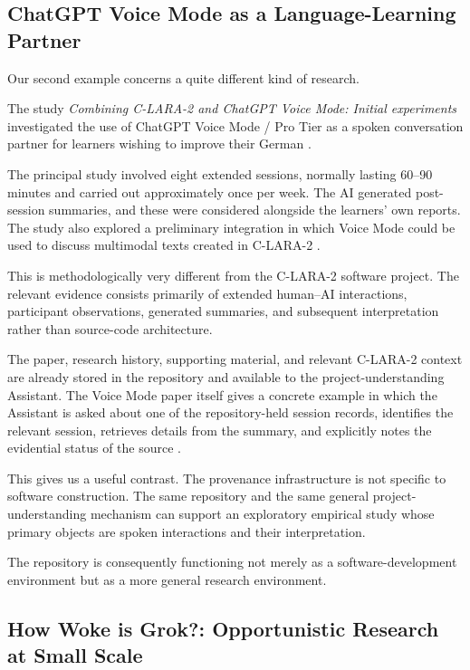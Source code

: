 \documentclass[12pt]{article}
\begin{document}
\subsection{ChatGPT Voice Mode as a Language-Learning Partner}

Our second example concerns a quite different kind of research.

The study \emph{Combining C-LARA-2 and ChatGPT Voice Mode: Initial experiments} investigated the use of ChatGPT Voice Mode / Pro Tier as a spoken conversation partner for learners wishing to improve their German \citep{wrightEtAl2026voice}.

The principal study involved eight extended sessions, normally lasting 60--90 minutes and carried out approximately once per week. The AI generated post-session summaries, and these were considered alongside the learners' own reports. The study also explored a preliminary integration in which Voice Mode could be used to discuss multimodal texts created in C-LARA-2 \citep[Sections~3--4]{wrightEtAl2026voice}.

This is methodologically very different from the C-LARA-2 software project. The relevant evidence consists primarily of extended human--AI interactions, participant observations, generated summaries, and subsequent interpretation rather than source-code architecture.

The paper, research history, supporting material, and relevant C-LARA-2 context are already stored in the repository and available to the project-understanding Assistant. The Voice Mode paper itself gives a concrete example in which the Assistant is asked about one of the repository-held session records, identifies the relevant session, retrieves details from the summary, and explicitly notes the evidential status of the source \citep[Section~5.2]{wrightEtAl2026voice}.

This gives us a useful contrast. The provenance infrastructure is not specific to software construction. The same repository and the same general project-understanding mechanism can support an exploratory empirical study whose primary objects are spoken interactions and their interpretation.

The repository is consequently functioning not merely as a software-development environment but as a more general research environment.


\subsection{How Woke is Grok?: Opportunistic Research at Small Scale}
\end{document}
